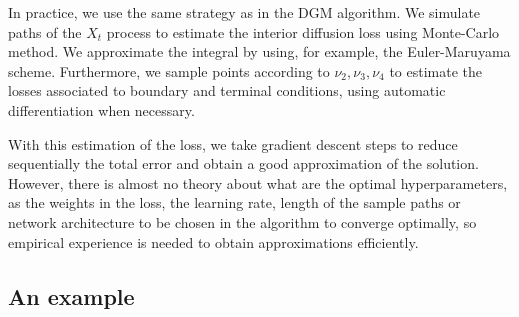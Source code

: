 In practice, we use the same strategy as in the DGM algorithm. We simulate paths  of the $X_t$ process to estimate the interior diffusion loss using Monte-Carlo method. We approximate the integral by using, for example, the Euler-Maruyama scheme. Furthermore, we sample points according to $\nu_2,\nu_3,\nu_4$ to estimate the losses associated to boundary and terminal conditions, using automatic differentiation when necessary. 

With this estimation of the loss, we take gradient descent steps to reduce sequentially the total error and obtain a good approximation of the solution. However, there is almost no theory about what are the optimal hyperparameters, as the weights in the loss, the learning rate, length of the sample paths or network architecture to be chosen in the algorithm to converge optimally, so empirical experience is needed to obtain approximations efficiently.


\subsection{An example}